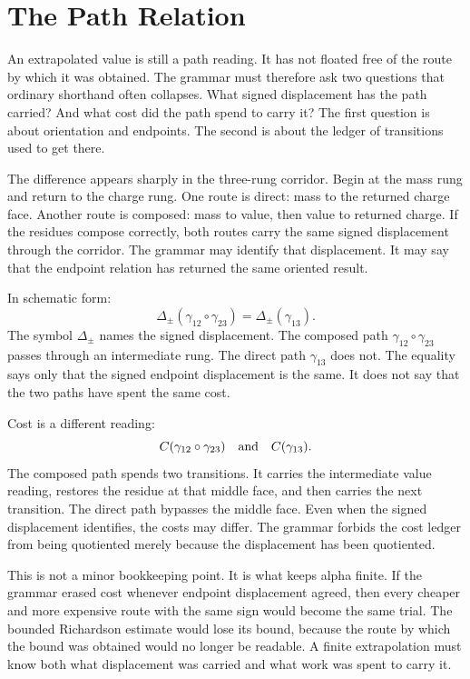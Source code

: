 \section{The Path Relation}

An extrapolated value is still a path reading. It has not floated free of the
route by which it was obtained. The grammar must therefore ask two questions
that ordinary shorthand often collapses. What signed displacement has the path
carried? And what cost did the path spend to carry it? The first question is
about orientation and endpoints. The second is about the ledger of transitions
used to get there.

The difference appears sharply in the three-rung corridor. Begin at the mass
rung and return to the charge rung. One route is direct: mass to the returned
charge face. Another route is composed: mass to value, then value to returned
charge. If the residues compose correctly, both routes carry the same signed
displacement through the corridor. The grammar may identify that displacement.
It may say that the endpoint relation has returned the same oriented result.

In schematic form:
\[
  \Delta_{\pm}(\gamma_{12}\circ\gamma_{23})
    = \Delta_{\pm}(\gamma_{13}) .
\]
The symbol \(\Delta_{\pm}\) names the signed displacement. The composed path
\(\gamma_{12}\circ\gamma_{23}\) passes through an intermediate rung. The
direct path \(\gamma_{13}\) does not. The equality says only that the signed
endpoint displacement is the same. It does not say that the two paths have
spent the same cost.

Cost is a different reading:
\[
  C(\gamma_{12}\circ\gamma_{23})
    \quad\hbox{and}\quad
  C(\gamma_{13}) .
\]
The composed path spends two transitions. It carries the intermediate value
reading, restores the residue at that middle face, and then carries the next
transition. The direct path bypasses the middle face. Even when the signed
displacement identifies, the costs may differ. The grammar forbids the cost
ledger from being quotiented merely because the displacement has been
quotiented.

This is not a minor bookkeeping point. It is what keeps alpha finite. If the
grammar erased cost whenever endpoint displacement agreed, then every cheaper
and more expensive route with the same sign would become the same trial. The
bounded Richardson estimate would lose its bound, because the route by which
the bound was obtained would no longer be readable. A finite extrapolation
must know both what displacement was carried and what work was spent to carry
it.

